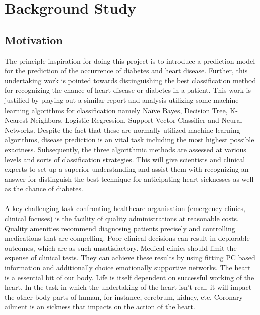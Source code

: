 \documentclass[oneside,12pt]{Classes/VTU}
\begin{document}
    \section{Background Study}
    \subsection{Motivation}

    The principle inspiration for doing this project is to introduce a prediction model for the prediction of the occurrence of diabetes and heart disease. Further, this undertaking work is pointed towards distinguishing the best classification method for recognizing the chance of heart disease or diabetes in a patient. This work is justified by playing out a similar report and analysis utilizing some machine learning algorithms for classification namely Naïve Bayes, Decision Tree, K-Nearest Neighbors, Logistic Regression, Support Vector Classifier and Neural Networks. Despite the fact that these are normally utilized machine learning algorithms, disease prediction is an vital task including the most highest possible exactness. Subsequently, the three algorithmic methods are assessed at various levels and sorts of classification strategies. This will give scientists and clinical experts to set up a superior understanding and assist them with recognizing an answer for distinguish the best technique for anticipating heart sicknesses as well as the chance of diabetes.
    \paragraph{}
    A key challenging task confronting healthcare organisation (emergency clinics, clinical focuses) is the facility of quality administrations at reasonable costs. Quality amenities recommend diagnosing patients precisely and controlling medications that are compelling. Poor clinical decisions can result in deplorable outcomes, which are as such unsatisfactory. Medical clinics should limit the expense of clinical tests. They can achieve these results by using fitting PC based information and additionally choice emotionally supportive networks. The heart is a essential bit of our body. Life is itself dependent on successful working of the heart. In the task in which the undertaking of the heart isn't real, it will impact the other body parts of human, for instance, cerebrum, kidney, etc. Coronary ailment is an sickness that impacts on the action of the heart.
\end{document}
